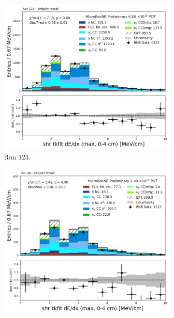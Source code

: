 \begin{figure}[H]
    \centering
    \begin{subfigure}[t]{0.32\linewidth}
        \includegraphics[width=\linewidth]{technote/Appendix_Preselection/Figures/1eNp0pi/Run123/shr_tkfit_dedx_max_Run123_1eNp0pi_Presel.png}
        \caption{Run 123.}
    \end{subfigure}%
    \hspace{0.2cm}%
    \begin{subfigure}[t]{0.32\linewidth}
        \includegraphics[width=\linewidth]{technote/Appendix_Preselection/Figures/1eNp0pi/Run4b/shr_tkfit_dedx_max_Run4b_1eNp0pi_Presel.png}

\end{subfigure}
\end{figure}
